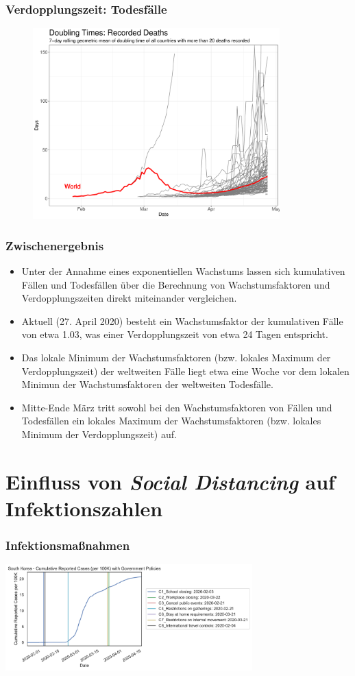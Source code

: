 \documentclass{beamer}
\begin{document}
\begin{frame}
	\frametitle{Verdopplungszeit: Todesfälle}
	\begin{figure}
		\centering
		\includegraphics[width = 270pt]{DT_deaths}
	\end{figure}
\end{frame}

 \begin{frame}
 	\frametitle{Zwischenergebnis}
 	\begin{itemize}
 		\item Unter der Annahme eines exponentiellen Wachstums lassen sich kumulativen Fällen und Todesfällen über die Berechnung von Wachstumsfaktoren und Verdopplungszeiten direkt miteinander vergleichen. 
 		\item Aktuell (27. April 2020) besteht ein Wachstumsfaktor der kumulativen Fälle von etwa 1.03, was einer Verdopplungszeit von etwa 24 Tagen entspricht.
 		\item Das lokale Minimum der Wachstumsfaktoren (bzw. lokales Maximum der Verdopplungszeit) der weltweiten Fälle liegt etwa eine Woche vor dem lokalen Minimun der Wachstumsfaktoren der weltweiten Todesfälle.
 		\item Mitte-Ende März tritt sowohl bei den Wachstumsfaktoren von Fällen und Todesfällen ein lokales Maximum der Wachstumsfaktoren (bzw. lokales Minimum der Verdopplungszeit) auf.
 	\end{itemize}
 \end{frame}

\section{Einfluss von \emph{Social Distancing} auf Infektionszahlen}
\begin{frame}
	\frametitle{Infektionsmaßnahmen}
	\centering
	\includegraphics[width = 270pt]{korea}
\end{frame}
\end{document}
